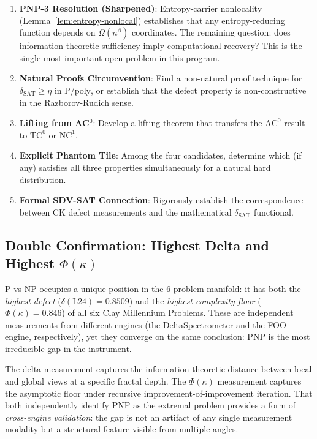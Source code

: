 \documentclass[11pt]{article}
\theoremstyle{definition}
\theoremstyle{remark}
\newcommand{\Ppoly}{\mathrm{P/poly}}
\newcommand{\ACz}{\mathrm{AC}^0}
\newcommand{\NCone}{\mathrm{NC}^1}
\newcommand{\TCz}{\mathrm{TC}^0}
\newcommand{\dSAT}{\delta_{\mathrm{SAT}}}
\begin{document}
\begin{enumerate}
  \item \textbf{PNP-3 Resolution (Sharpened)}: Entropy-carrier nonlocality
    (Lemma~\ref{lem:entropy-nonlocal}) establishes that any entropy-reducing
    function depends on $\Omega(n^\beta)$ coordinates.  The remaining question:
    does information-theoretic sufficiency imply computational recovery?
    This is the single most important open problem in this program.

  \item \textbf{Natural Proofs Circumvention}: Find a non-natural proof
    technique for $\dSAT \geq \eta$ in $\Ppoly$, or establish that the
    defect property is non-constructive in the Razborov-Rudich sense.

  \item \textbf{Lifting from AC$^0$}: Develop a lifting theorem that
    transfers the $\ACz$ result to $\TCz$ or $\NCone$.

  \item \textbf{Explicit Phantom Tile}: Among the four candidates, determine
    which (if any) satisfies all three properties simultaneously for a
    natural hard distribution.

  \item \textbf{Formal SDV-SAT Connection}: Rigorously establish the
    correspondence between CK defect measurements and the mathematical
    $\dSAT$ functional.
\end{enumerate}

\subsection{Double Confirmation: Highest Delta and Highest $\Phi(\kappa)$}

P vs NP occupies a unique position in the 6-problem manifold: it has both
the \emph{highest defect} ($\delta(\text{L24}) = 0.8509$) and the
\emph{highest complexity floor} ($\Phi(\kappa) = 0.846$) of all six Clay
Millennium Problems.  These are independent measurements from different
engines (the DeltaSpectrometer and the FOO engine, respectively), yet they
converge on the same conclusion: PNP is the most irreducible gap in the
instrument.

The delta measurement captures the information-theoretic distance between
local and global views at a specific fractal depth.  The $\Phi(\kappa)$
measurement captures the asymptotic floor under recursive
improvement-of-improvement iteration.  That both independently identify PNP
as the extremal problem provides a form of \emph{cross-engine validation}:
the gap is not an artifact of any single measurement modality but a
structural feature visible from multiple angles.
\end{document}
